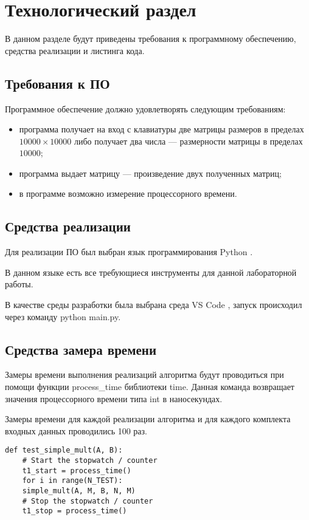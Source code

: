 \chapter{Технологический раздел}

В данном разделе будут приведены требования к программному обеспечению, средства реализации и листинга кода.

\section{Требования к ПО}

Программное обеспечение должно удовлетворять следующим требованиям:
\begin{itemize}
	\item программа получает на вход с клавиатуры две матрицы размеров в пределах $10000 \times 10000$ либо получает два числа --- размерности матрицы в пределах $10000$;
	\item программа выдает матрицу --- произведение двух полученных матриц;
	\item в программе возможно измерение процессорного времени.
\end{itemize}

\section{Средства реализации} 
Для реализации ПО был выбран язык программирования Python \cite{python}. 

В данном языке есть все требующиеся инструменты для данной лабораторной работы.

В качестве среды разработки была выбрана среда VS Code \cite{vscode}, запуск происходил через команду python main.py.

\section{Средства замера времени}

Замеры времени выполнения реализаций алгоритма будут проводиться при помощи функции process\_time \cite{test} библиотеки time. Данная команда возвращает значения процессорного времени типа int в наносекундах.

Замеры времени для каждой реализации алгоритма и для каждого комплекта входных данных проводились 100 раз.

\begin{lstlisting}[label=bench,caption=Пример замера затраченного времени]
	def test_simple_mult(A, B):
	# Start the stopwatch / counter 
	t1_start = process_time() 
	for i in range(N_TEST):
	simple_mult(A, M, B, N, M)
	# Stop the stopwatch / counter
	t1_stop = process_time()
\end{lstlisting}



